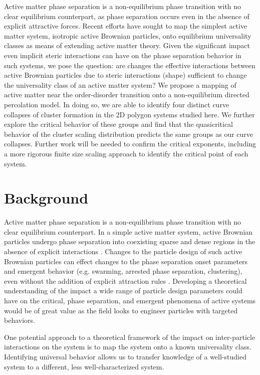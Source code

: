 Active matter phase separation is a non-equilibrium phase transition with no clear equilibrium counterpart, as phase separation occurs even in the absence of explicit attractive forces.
Recent efforts have sought to map the simplest active matter system, isotropic active Brownian particles, onto equilibrium universality classes as means of extending active matter theory.
Given the significant impact even implicit steric interactions can have on the phase separation behavior in such systems, we pose the question: are changes the effective interactions between active Brownian particles due to steric interactions (shape) sufficient to change the universality class of an active matter system?
We propose a mapping of active matter near the order-disorder transition onto a non-equilibrium directed percolation model.
In doing so, we are able to identify four distinct curve collapses of cluster formation in the 2D polygon systems studied here.
We further explore the critical behavior of these groups and find that the quasicritical behavior of the cluster scaling distribution predicts the same groups as our curve collapses.
Further work will be needed to confirm the critical exponents, including a more rigorous finite size scaling approach to identify the critical point of each system.

\section{Background}
Active matter phase separation is a non-equilibrium phase transition with no clear equilibrium counterpart.
In a simple active matter system, active Brownian particles undergo phase separation into coexisting sparse and dense regions in the absence of explicit interactions \cite{citation_needed}. %
Changes to the particle design of such active Brownian particles can effect changes to the phase separation onset parameters\cite{Prymidis_2015_SoftMatter,Moran_2020} and emergent behavior (e.g. swarming, arrested phase separation, clustering), even without the addition of explicit attraction rules \cite{citation_needed}.
Developing a theoretical understanding of the impact a wide range of particle design parameters could have on the critical, phase separation, and emergent phenomena of active systems would be of great value as the field looks to engineer particles with targeted behaviors.

One potential approach to a theoretical framework of the impact on inter-particle interactions on the system is to map the system onto a known universality class.
Identifying universal behavior allows us to transfer knowledge of a well-studied system to a different, less well-characterized system.

